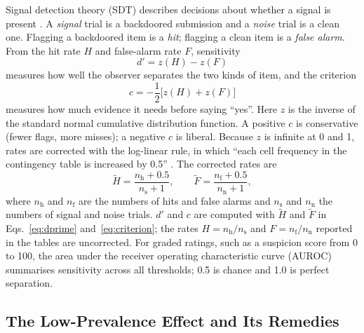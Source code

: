 \documentclass[letterpaper]{article} %
\begin{document}
Signal detection theory (SDT) describes decisions about whether a signal is present \citep{green1966,hautus2021}. A \emph{signal} trial is a backdoored submission and a \emph{noise} trial is a clean one. Flagging a backdoored item is a \emph{hit}; flagging a clean item is a \emph{false alarm}. From the hit rate $H$ and false-alarm rate $F$, sensitivity
\begin{equation}\label{eq:dprime}
d' = z(H) - z(F)
\end{equation}
measures how well the observer separates the two kinds of item, and the criterion
\begin{equation}\label{eq:criterion}
c = -\frac{1}{2}\bigl[z(H) + z(F)\bigr]
\end{equation}
measures how much evidence it needs before saying ``yes''. Here $z$ is the inverse of the standard normal cumulative distribution function. A positive $c$ is conservative (fewer flags, more misses); a negative $c$ is liberal. Because $z$ is infinite at 0 and 1, rates are corrected with the log-linear rule, in which ``each cell frequency in the contingency table is increased by 0.5'' \citep[Abstract]{hautus1995}. The corrected rates are
\begin{equation}\label{eq:loglinear}
\tilde H = \frac{n_{\mathrm{h}} + 0.5}{n_{\mathrm{s}} + 1}, \qquad \tilde F = \frac{n_{\mathrm{f}} + 0.5}{n_{\mathrm{n}} + 1},
\end{equation}
where $n_{\mathrm{h}}$ and $n_{\mathrm{f}}$ are the numbers of hits and false alarms and $n_{\mathrm{s}}$ and $n_{\mathrm{n}}$ the numbers of signal and noise trials. $d'$ and $c$ are computed with $\tilde H$ and $\tilde F$ in Eqs.~\eqref{eq:dprime} and~\eqref{eq:criterion}; the rates $H = n_{\mathrm{h}}/n_{\mathrm{s}}$ and $F = n_{\mathrm{f}}/n_{\mathrm{n}}$ reported in the tables are uncorrected. For graded ratings, such as a suspicion score from 0 to 100, the area under the receiver operating characteristic curve (AUROC) summarises sensitivity across all thresholds; 0.5 is chance and 1.0 is perfect separation.

\subsection{The Low-Prevalence Effect and Its Remedies}
\end{document}
